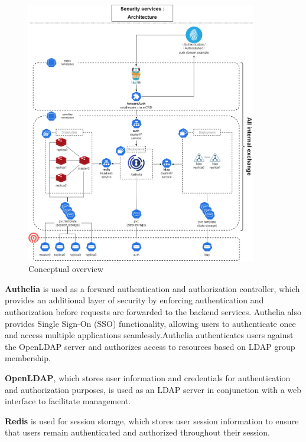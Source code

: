 \begin{figure}[H]\centering
\includegraphics[width=0.9\textwidth,angle=00]{assets/f51.png}
\caption{Conceptual overview }
\label{fig:f51}
\end{figure} 

\hspace{7mm}\textbf{Authelia} is used as a forward authentication and authorization controller, which provides an additional layer of security by enforcing authentication and authorization before requests are forwarded to the backend services. Authelia also provides Single Sign-On (SSO) functionality, allowing users to authenticate once and access multiple applications seamlessly.Authelia authenticates users against the OpenLDAP server and authorizes access to resources based on LDAP group membership.  

\hspace{7mm}\textbf{OpenLDAP}, which stores user information and credentials for authentication and authorization purposes, is used as an LDAP server in conjunction with a web interface to facilitate management. 

\hspace{7mm}\textbf{Redis} is used for session storage, which stores user session information to ensure that users remain authenticated and authorized throughout their session. 

